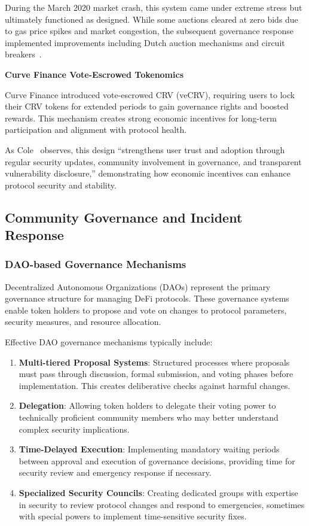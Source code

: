 \documentclass[conference]{IEEEtran}
\begin{document}
    During the March 2020 market crash, this system came under extreme stress but ultimately functioned as designed. While some auctions cleared at zero bids due to gas price spikes and market congestion, the subsequent governance response implemented improvements including Dutch auction mechanisms and circuit breakers~\cite{werner2021sok}.

    \textbf{Curve Finance Vote-Escrowed Tokenomics}

    Curve Finance introduced vote-escrowed CRV (veCRV), requiring users to lock their CRV tokens for extended periods to gain governance rights and boosted rewards. This mechanism creates strong economic incentives for long-term participation and alignment with protocol health.

    As Cole~\cite{cole2024understanding} observes, this design ``strengthens user trust and adoption through regular security updates, community involvement in governance, and transparent vulnerability disclosure,'' demonstrating how economic incentives can enhance protocol security and stability.

\subsection{Community Governance and Incident Response}
    \subsubsection{DAO-based Governance Mechanisms}
    Decentralized Autonomous Organizations (DAOs) represent the primary governance structure for managing DeFi protocols. These governance systems enable token holders to propose and vote on changes to protocol parameters, security measures, and resource allocation.

    Effective DAO governance mechanisms typically include:
    \begin{enumerate}
        \item \textbf{Multi-tiered Proposal Systems}: Structured processes where proposals must pass through discussion, formal submission, and voting phases before implementation. This creates deliberative checks against harmful changes.
        
        \item \textbf{Delegation}: Allowing token holders to delegate their voting power to technically proficient community members who may better understand complex security implications.
        
        \item \textbf{Time-Delayed Execution}: Implementing mandatory waiting periods between approval and execution of governance decisions, providing time for security review and emergency response if necessary.
        
        \item \textbf{Specialized Security Councils}: Creating dedicated groups with expertise in security to review protocol changes and respond to emergencies, sometimes with special powers to implement time-sensitive security fixes.
    \end{enumerate}
\end{document}
